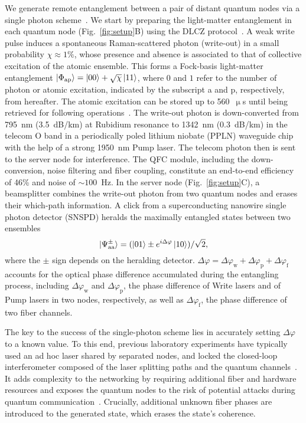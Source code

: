 \documentclass[aps,reprint,showpacs,superscriptaddress]{revtex4-2}
\begin{document}
We generate remote entanglement between a pair of distant quantum nodes via a single photon scheme~\cite{duan2001}. We start by preparing the light-matter entanglement in each quantum node (Fig.~\ref{fig:setup}B) using the DLCZ protocol~\cite{duan2001}. A weak write pulse induces a spontaneous Raman-scattered photon (write-out) in a small probability $\chi\approx1\%$, whose presence and absence is associated to that of collective excitation of the atomic ensemble. This forms a Fock-basis light-matter entanglement $\ket{\Phi_{\textrm{ap}}}=\ket{00}+\sqrt{\chi}\ket{11}$, where $0$ and $1$ refer to the number of photon or atomic excitation, indicated by the subscript a and p, respectively, from hereafter. The atomic excitation can be stored up to 560~$\upmu$s until being retrieved for following operations~\cite{luo2022}. The write-out photon is down-converted from 795~nm (3.5~dB/km) at Rubidium resonance to 1342~nm (0.3~dB/km) in the telecom O band in a periodically poled lithium niobate (PPLN) waveguide chip with the help of a strong 1950~nm Pump laser. The telecom photon then is sent to the server node for interference. The QFC module, including the down-conversion, noise filtering and fiber coupling, constitute an end-to-end efficiency of 46\% and noise of $\sim100$~Hz. In the server node (Fig.~\ref{fig:setup}C), a beamsplitter combines the write-out photon from two quantum nodes and erases their which-path information. A click from a superconducting nanowire single photon detector (SNSPD) heralds the maximally entangled states between two ensembles 
\begin{equation}\label{eq:EntFock}
	\ket{\Psi_{\textrm{aa}}^{\pm}}=(\ket{01}\pm e^{i\Delta\varphi}\ket{10})/\sqrt{2},
\end{equation}
where the $\pm$ sign depends on the heralding detector. $\Delta\varphi=\Delta\varphi_\text{w} +\Delta\varphi_\text{p} + \Delta\varphi_{\text{f}}$ accounts for the optical phase difference accumulated during the entangling process, including $\Delta\varphi_\text{w}$ and $\Delta\varphi_\text{p}$, the phase difference of Write lasers and of Pump lasers in two nodes, respectively, as well as $\Delta\varphi_{\text{f}}$, the phase difference of two fiber channels.

The key to the success of the single-photon scheme lies in accurately setting $\Delta\varphi$ to a known value. To this end, previous laboratory experiments have typically used an ad hoc laser shared by separated nodes, and locked the closed-loop interferometer composed of the laser splitting paths and the quantum channels~\cite{chou2005,stockill2017,yu2020,pompili2021,lago-rivera2021}. It adds complexity to the networking by requiring additional fiber and hardware resources and exposes the quantum nodes to the risk of potential attacks during quantum communication~\cite{pang2020a}. Crucially, additional unknown fiber phases are introduced to the generated state, which erases the state's coherence.
\end{document}
